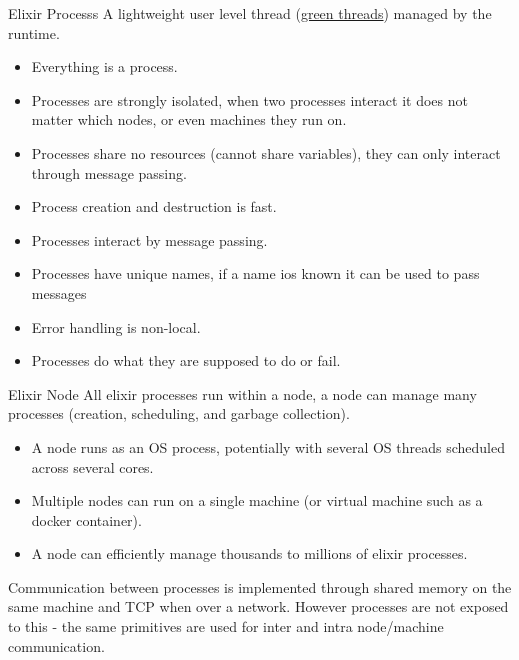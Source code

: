\begin{definitionbox}{Elixir Processs}
  A lightweight user level thread (\href{https://en.wikipedia.org/wiki/Green_thread}{green threads}) managed by the runtime.
  \begin{itemize}
    \item Everything is a process.
    \item Processes are strongly isolated, when two processes interact it does not matter which nodes, or even machines they run on.
    \item Processes share no resources (cannot share variables), they can only interact through message passing.
    \item Process creation and destruction is fast.
    \item Processes interact by message passing.
    \item Processes have unique names, if a name ios known it can be used to pass messages
    \item Error handling is non-local.
    \item Processes do what they are supposed to do or fail.
  \end{itemize}
\end{definitionbox}
\begin{definitionbox}{Elixir Node}
  All elixir processes run within a node, a node can manage many processes (creation, scheduling, and garbage collection).
  \begin{itemize}
    \item A node runs as an OS process, potentially with several OS threads scheduled across several cores.
    \item Multiple nodes can run on a single machine (or virtual machine such as a docker container).
    \item A node can efficiently manage thousands to millions of elixir processes.
  \end{itemize}
\end{definitionbox}

Communication between processes is implemented through shared memory on the same machine and TCP when over a network. However processes are not exposed to this - the same primitives are used for inter and intra node/machine communication.

